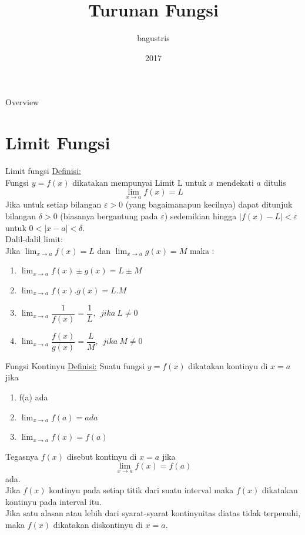 \documentclass{beamer}
\title{Turunan Fungsi}
\author{bagustris}
\date{2017}
\begin{document}
	\frame{\titlepage}
	
\begin{frame}[t,fragile]{Overview}
\tableofcontents
\end{frame}

\section{Limit Fungsi}
\begin{frame}[t, fragile] {Limit fungsi}
\underline{Definisi:} \\
Fungsi $y=f(x)$ dikatakan mempunyai Limit L untuk $x$ mendekati $a$ ditulis  $$\lim_{x\to a} f(x) = L$$ 
Jika untuk setiap bilangan $\varepsilon > 0$ (yang bagaimanapun kecilnya) dapat ditunjuk bilangan $\delta > 0$ (biasanya bergantung pada $\varepsilon$) sedemikian hingga $| f(x) - L | < \varepsilon$ untuk $ 0 < |x -a| < \delta$.\\
\vskip5pt
Dalil-dalil limit: \\
Jika $\lim_{x\to a} f(x) = L$ dan $\lim_{x\to a} g(x) = M$ maka : \\
\begin{enumerate}
\item $\lim_{x\to a} {f(x) \pm g(x) }= L \pm M$
\item $\lim_{x\to a} {f(x) . g(x) }= L . M$
\item $\lim_{x\to a} \dfrac{1}{f(x)}= \dfrac{1}{L}, ~~jika~ L \neq 0 $
\item $\lim_{x\to a} \dfrac{f(x)}{g(x)}= \dfrac{L}{M}, ~~jika~ M \neq 0 $
\end{enumerate}
\end{frame}

\begin{frame}[t, fragile] {Fungsi Kontinyu}
\underline{Definisi:} Suatu fungsi $y=f(x)$ dikatakan kontinyu di $x=a$ jika 
\begin{enumerate}
\item f(a) ada
\item $\lim_{x\to a} f(a)= ada$
\item $\lim_{x\to a} f(x) = f(a)$
\end{enumerate}
Tegasnya $f(x)$ disebut kontinyu di $x=a$ jika $$\lim_{x\to a} f(x) = f(a)$$ ada. \\
\vskip5pt
Jika $f(x)$ kontinyu pada setiap titik dari suatu interval maka $f(x)$ dikatakan kontinyu pada interval itu. \\
\vskip5pt
Jika satu alasan atau lebih dari syarat-syarat kontinyuitas diatas tidak terpenuhi, maka $f(x)$ dikatakan diskontinyu di $x=a$.

\end{frame}
\end{document}

